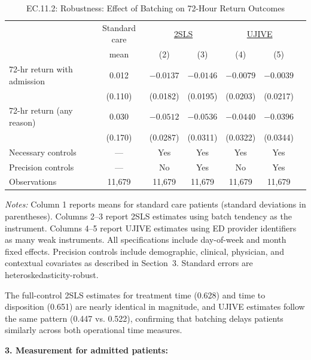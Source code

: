 \documentclass[11pt]{article}
\newcommand{\1}{\hbox{\rm 1\kern-.35em 1}}
\begin{document}
\begin{table}[t!]
\centering
\caption*{EC.11.2: Robustness: Effect of Batching on 72-Hour Return Outcomes}
\begin{threeparttable}
\begin{tabular}{lcccccc}
\toprule
& Standard care & \multicolumn{2}{c}{\underline{2SLS}} 
& \multicolumn{2}{c}{\underline{UJIVE}} \\
& mean & (2) & (3) & (4) & (5) \\
\midrule
72-hr return with admission 
& 0.012 
& $-0.0137$ & $-0.0146$ 
& $-0.0079$ & $-0.0039$ \\
& (0.110)
& (0.0182) & (0.0195)
& (0.0203) & (0.0217) \\[1em]
72-hr return (any reason)
& 0.030 
& $-0.0512$ & $-0.0536$ 
& $-0.0440$ & $-0.0396$ \\
& (0.170)
& (0.0287) & (0.0311)
& (0.0322) & (0.0344) \\[1em]

\midrule
Necessary controls & --- & Yes & Yes & Yes & Yes \\
Precision controls & --- & No  & Yes & No  & Yes \\
Observations       & 11,679 & 11,679 & 11,679 & 11,679 & 11,679 \\
\bottomrule
\end{tabular}
\begin{flushleft}
\footnotesize
\textit{Notes:} Column 1 reports means for standard care patients (standard deviations in parentheses). 
Columns 2--3 report 2SLS estimates using batch tendency as the instrument. Columns 4--5 report UJIVE estimates using ED provider identifiers as many weak instruments. All specifications include day-of-week and month fixed effects. Precision controls include demographic, clinical, physician, and contextual covariates as described in Section~3. Standard errors are heteroskedasticity-robust.
\end{flushleft}

\end{threeparttable}
\end{table}

The full-control 2SLS estimates for treatment time (0.628) and time to disposition (0.651) are nearly identical in magnitude, and UJIVE estimates follow the same pattern (0.447 vs. 0.522), confirming that batching delays patients similarly across both operational time measures.

\textbf{3. Measurement for admitted patients:}
\end{document}
